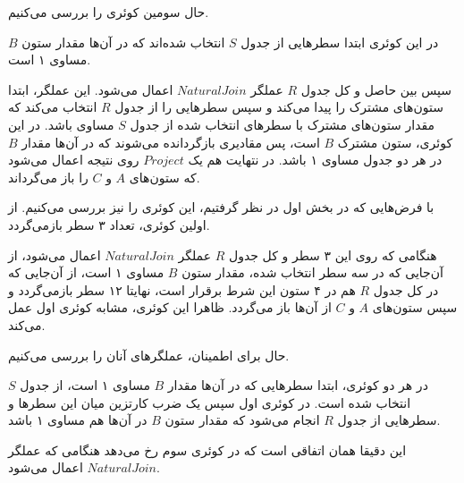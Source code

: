حال سومین کوئری را بررسی می‌کنیم.


در این کوئری ابتدا سطرهایی از جدول
$S$
انتخاب شده‌اند که در آن‌ها مقدار ستون
$B$
مساوی ۱ است.


سپس بین حاصل و کل جدول
$R$
عملگر
$Natural Join$
اعمال می‌شود.
این عملگر، ابتدا ستون‌های مشترک را پیدا می‌کند و سپس سطرهایی را از جدول
$R$
انتخاب می‌کند که مقدار ستون‌های مشترک با سطرهای انتخاب شده از جدول
$S$
مساوی باشد.
در این کوئری، ستون مشترک
$B$
است، پس مقادیری بازگردانده می‌شوند که در آن‌ها مقدار
$B$
در هر دو جدول مساوی ۱ باشد.
در نتهایت هم یک 
$Project$
روی نتیجه اعمال می‌شود که ستون‌های
$A$
و
$C$
را باز می‌گرداند.

با فرض‌هایی که در بخش اول در نظر گرفتیم، این کوئری را نیز بررسی می‌کنیم.
از اولین کوئری، تعداد ۳ سطر بازمی‌گردد.

هنگامی که روی این ۳ سطر و کل جدول
$R$
عملگر 
$Natural Join$
اعمال می‌شود، از آن‌جایی که در سه سطر انتخاب شده، مقدار ستون
$B$
مساوی ۱ است، از آن‌جایی که در کل جدول
$R$
هم  در ۴ ستون این شرط برقرار است، نهایتا ۱۲ سطر بازمی‌گردد و سپس ستون‌های
$A$
و
$C$
از آن‌ها باز می‌گردد.
ظاهرا این کوئری، مشابه کوئری اول عمل می‌کند.

حال برای اطمینان، عملگرهای آنان را بررسی می‌کنیم.

در هر دو کوئری، ابتدا سطرهایی که در آن‌ها مقدار
$B$
مساوی ۱ است، از جدول
$S$
انتخاب شده است.
در کوئری اول سپس یک ضرب کارتزین میان این سطرها و سطرهایی از جدول
$R$
انجام می‌شود که مقدار ستون
$B$
در آن‌ها هم مساوی ۱ باشد.

این دقیقا همان اتفاقی است که در کوئری سوم رخ می‌دهد هنگامی که عملگر
$Natural Join$
اعمال می‌شود.


